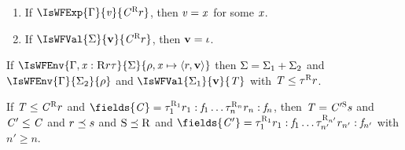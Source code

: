 \begin{lemma}\label{lem:canonical}
\begin{enumerate}
\item \label{lem:canonical:ve:x} If $\IsWFExp{\Gamma}{\ve}{\Graded{\C}{\Rgr}{\rgr}}$, then $\mathit{v}=\mathit{x}$ for some $\mathit{x}$.
\item \label{lem:canonical:val:loc} If  $\IsWFVal{\Sigma}{\val}{\Graded{\C}{\Rgr}{\rgr}}$, then $\mathbf{v}=\iota$.
\end{enumerate}
\end{lemma}


\begin{lemma}\label{lem:dividiEnv}
If $ \IsWFEnv{\Gamma, \CtxElem{\x}{\Rgr}{\rgr}{\tau}}{\Sigma}{\env,\EnvElem{\x}{\rgr}{\val}}$ then $\Sigma=\Sigma_1+\Sigma_2$ and 
$ \IsWFEnv{\Gamma}{\Sigma_2}{\env}$ and $\IsWFVal{\Sigma_1}{\val}{\T}$ with $\mathit{T}\leq\tau^{\textsc{R}}{r}$.
\end{lemma}
%

\bpa
\begin{lemma}\label{lem:subClass}
If $\mathit{T}\leq\mathit{C}^{\textsc{R}}{r}$ and $\fields{\C}=\Field{\Graded{\tau_1}{\Rgr_1}{\rgr_1}}{\f_1} \ldots \Field{\Graded{\tau_n}{\Rgr_n}{\rgr_n}}{\f_n}$, then 
$\mathit{T}=\mathit{C}'^{\textsc{S}}{s}$  and $\mathit{C}'\leq\mathit{C}$ and $r\preceq s$ and $\textsc{S}\preceq\textsc{R}$ and  $\fields{\C'}=\Field{\Graded{\tau_1}{\Rgr_1}{\rgr_1}}{\f_1} \ldots \Field{\Graded{\tau_{n'}}{\Rgr_{n'}}{\rgr_{n'}}}{\f_{n'}}$ with $n'\geq n$.
\end{lemma}


